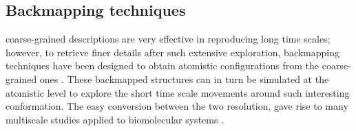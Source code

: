 \subsection{Backmapping techniques} coarse-grained descriptions are very effective in reproducing long time scales; however, to retrieve finer details after such extensive exploration, backmapping techniques have been designed to obtain atomistic configurations from the coarse-grained ones \citep{Wassenaar2015}. These backmapped structures can in turn be simulated at the atomistic level to explore the short time scale movements around such interesting conformation. The easy conversion between the two resolution, gave rise to many multiscale studies applied to biomolecular systems \citep{Lee2012}.

%
%
